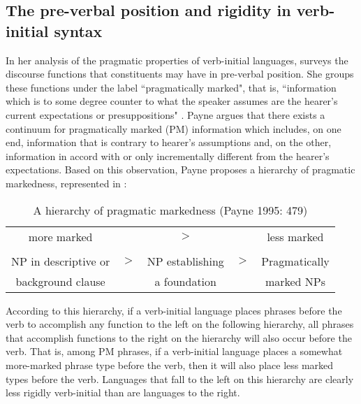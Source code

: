 \subsection{The pre-verbal position and rigidity in verb-initial syntax}

In her analysis of the pragmatic properties of verb-initial languages, \citet{payne1995} surveys the discourse functions that constituents may have in pre-verbal position. She groups these functions under the label ``pragmatically marked", that is, ``information which is to some degree counter to what the speaker assumes are the hearer's current expectations or presuppositions" \citep[110]{payne1995}. Payne argues that there exists a continuum for pragmatically marked (PM) information which includes, on one end, information that is contrary to hearer's assumptions and, on the other, information in accord with or only incrementally different from the hearer's expectations. Based on this observation, Payne proposes a hierarchy of pragmatic markedness, represented in :

\singlespacing
\begin{table}[H]
\begin{center}
\begin{tabular}{| c c c c c |}\hline
more marked & & $>$ & & less marked \\
 & & &  & \\
NP in descriptive or &  $>$ & NP establishing & $>$ & Pragmatically  \\
background clause &  & a foundation &  &  marked NPs \\
\hline
\end{tabular}\caption{\small{A hierarchy of pragmatic markedness (Payne 1995: 479)}}
\label{pragmaticmarkednesstable}
\end{center}
\end{table} 
According to this hierarchy, if a verb-initial language places phrases before the verb to accomplish any function to the left on the following hierarchy, all phrases that accomplish functions to the right on the hierarchy will also occur before the verb. That is, among PM phrases, if a verb-initial language places a somewhat more-marked phrase type before the verb, then it will also place less marked types before the verb. Languages that fall to the left on this hierarchy are clearly less rigidly verb-initial than are languages to the right.

